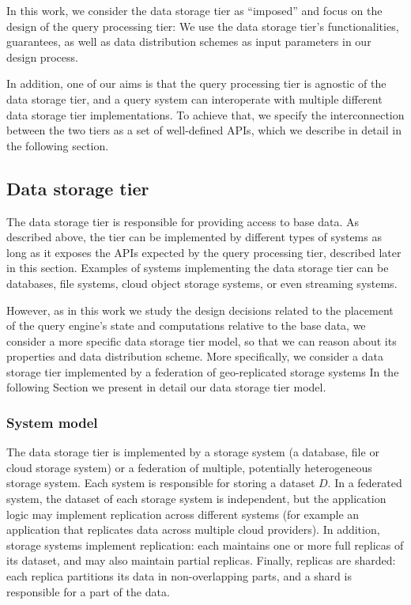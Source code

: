 In this work, we consider the data storage tier as ``imposed'' and focus on the design of the query processing tier:
We use the data storage tier's functionalities, guarantees, as well as data distribution schemes as input parameters
in our design process.

In addition, one of our aims is that the query processing tier is agnostic of the data storage tier, and a query
system can interoperate with multiple different data storage tier implementations.
To achieve that, we specify the interconnection between the two tiers as a set of well-defined APIs, which we describe
in detail in the following section.

\subsection{Data storage tier}
The data storage tier is responsible for providing access to base data.
As described above, the tier can be implemented by different types of systems as long as it exposes the APIs expected by
the query processing tier, described later in this section.
Examples of systems implementing the data storage tier can be databases, file systems, cloud object storage systems,
or even streaming systems.

However, as in this work we study the design decisions related to the placement of the query engine's state and
computations relative to the base data, we consider a more specific data storage tier model, so that we can reason about
its properties and data distribution scheme.
More specifically, we consider a data storage tier implemented by a federation of geo-replicated storage systems
In the following Section we present in detail our data storage tier model.

\subsubsection{System model}
The data storage tier is implemented by a storage system (a database, file or cloud storage system) or a federation of
multiple, potentially heterogeneous storage system.
Each system is responsible for storing a dataset $D$.
In a federated system, the dataset of each storage system is independent, but the application logic may implement
replication across different systems (for example an application that replicates data across multiple cloud providers).
In addition, storage systems implement replication: each maintains one or more full replicas of its dataset, and may also
maintain partial replicas.
Finally, replicas are sharded: each replica partitions its data in non-overlapping parts, and a shard is responsible
for a part of the data.

